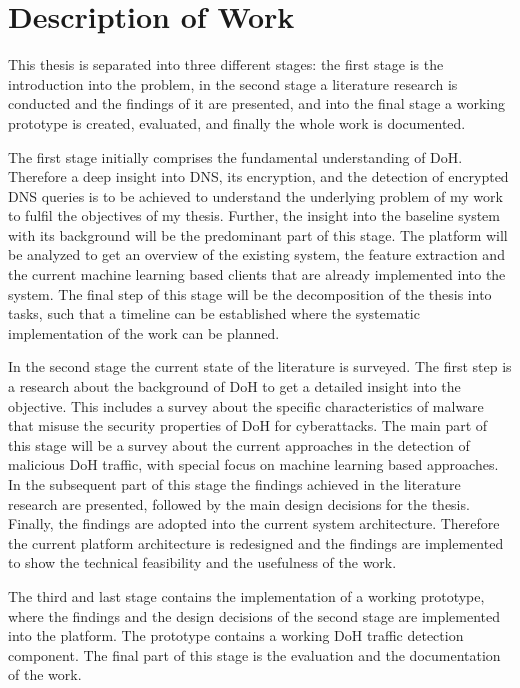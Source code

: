 \section{Description of Work} \label{description}
This thesis is separated into three different stages: the first stage is the introduction into the problem, in the second stage a literature research is conducted and the findings of it are presented, and into the final stage a working prototype is created, evaluated, and finally the whole work is documented.

The first stage initially comprises the fundamental understanding of DoH. Therefore a deep insight into DNS, its encryption, and the detection of encrypted DNS queries is to be achieved to understand the underlying problem of my work to fulfil the objectives of my thesis. Further, the insight into the baseline system with its background will be the predominant part of this stage. The platform will be analyzed to get an overview of the existing system, the feature extraction and the current machine learning based clients that are already implemented into the system. The final step of this stage will be the decomposition of the thesis into tasks, such that a timeline can be established where the systematic implementation of the work can be planned.

In the second stage the current state of the literature is surveyed. The first step is a research about the background of DoH to get a detailed insight into the objective. This includes a survey about the specific characteristics of malware that misuse the security properties of DoH for cyberattacks. The main part of this stage will be a survey about the current approaches in the detection of malicious DoH traffic, with special focus on machine learning based approaches. In the subsequent part of this stage the findings achieved in the literature research are presented, followed by the main design decisions for the thesis. Finally, the findings are adopted into the current system architecture. Therefore the current platform architecture is redesigned and the findings are implemented to show the technical feasibility and the usefulness of the work. 

The third and last stage contains the implementation of a working prototype, where the findings and the design decisions of the second stage are implemented into the platform. The prototype contains a working DoH traffic detection component. The final part of this stage is the evaluation and the documentation of the work.



